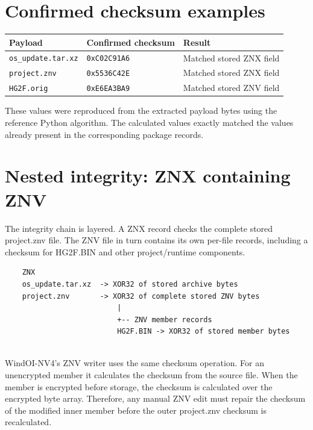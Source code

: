 \documentclass[]{article}
\begin{document}
\section{Confirmed checksum examples}
\begin{center}
\begin{tabularx}{\textwidth}{@{}l l X@{}}
\toprule
\textbf{Payload} & \textbf{Confirmed checksum} & \textbf{Result} \\
\midrule
\texttt{os\_update.tar.xz} & \texttt{0xC02C91A6} & Matched stored ZNX field \\
\texttt{project.znv} & \texttt{0x5536C42E} & Matched stored ZNX field \\
\texttt{HG2F.orig} & \texttt{0xE6EA3BA9} & Matched stored ZNV field \\
\bottomrule
\end{tabularx}
\end{center}

These values were reproduced from the extracted payload bytes using the reference Python algorithm. The calculated values exactly matched the values already present in the corresponding package records.


\section{Nested integrity: ZNX containing ZNV}
The integrity chain is layered. A ZNX record checks the complete stored project.znv file. The ZNV file in turn contains its own per-file records, including a checksum for HG2F.BIN and other project/runtime components.
\begin{verbatim}
	ZNX
	os_update.tar.xz  -> XOR32 of stored archive bytes
	project.znv       -> XOR32 of complete stored ZNV bytes
	                      |
	                      +-- ZNV member records
	                      HG2F.BIN -> XOR32 of stored member bytes
	
\end{verbatim}
WindOI-NV4's ZNV writer uses the same checksum operation. For an unencrypted member it calculates the checksum from the source file. When the member is encrypted before storage, the checksum is calculated over the encrypted byte array. Therefore, any manual ZNV edit must repair the checksum of the modified inner member before the outer project.znv checksum is recalculated.
\end{document}
